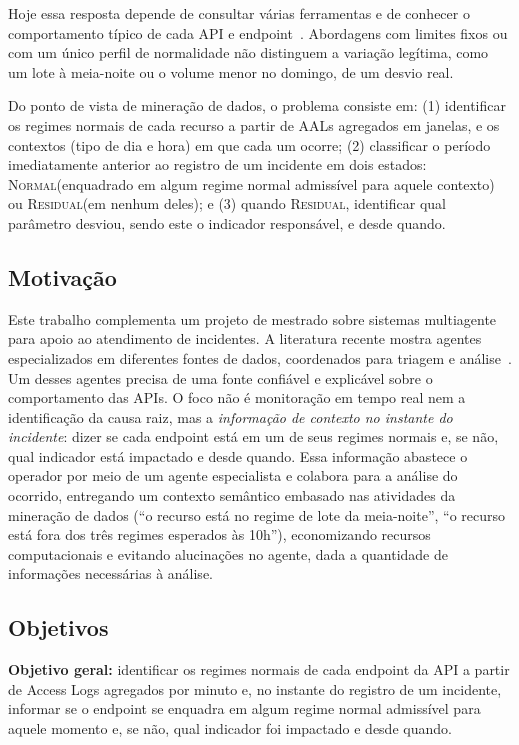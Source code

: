 \documentclass[sigconf,nonacm]{acmart}
\newcommand{\Normal}{\textsc{Normal}\xspace}
\newcommand{\Residual}{\textsc{Residual}\xspace}
\begin{document}
Hoje essa resposta depende de consultar várias ferramentas e de conhecer o comportamento típico de cada API e endpoint~\citep{zhang2025isre}. Abordagens com limites fixos ou com um único perfil de normalidade não distinguem a variação legítima, como um lote à meia-noite ou o volume menor no domingo, de um desvio real.

Do ponto de vista de mineração de dados, o problema consiste em: (1) identificar os regimes normais de cada recurso a partir de AALs agregados em janelas, e os contextos (tipo de dia e hora) em que cada um ocorre; (2) classificar o período imediatamente anterior ao registro de um incidente em dois estados: \Normal (enquadrado em algum regime normal admissível para aquele contexto) ou \Residual (em nenhum deles); e (3) quando \Residual, identificar qual parâmetro desviou, sendo este o indicador responsável, e desde quando.

\subsection{Motivação}
Este trabalho complementa um projeto de mestrado sobre sistemas multiagente para apoio ao atendimento de incidentes. A literatura recente mostra agentes especializados em diferentes fontes de dados, coordenados para triagem e análise~\citep{yu2025triangle,luo2025opsagent,zhang2025isre}. Um desses agentes precisa de uma fonte confiável e explicável sobre o comportamento das APIs. O foco não é monitoração em tempo real nem a identificação da causa raiz, mas a \emph{informação de contexto no instante do incidente}: dizer se cada endpoint está em um de seus regimes normais e, se não, qual indicador está impactado e desde quando. Essa informação abastece o operador por meio de um agente especialista e colabora para a análise do ocorrido, entregando um contexto semântico embasado nas atividades da mineração de dados (``o recurso está no regime de lote da meia-noite'', ``o recurso está fora dos três regimes esperados às 10h''), economizando recursos computacionais e evitando alucinações no agente, dada a quantidade de informações necessárias à análise.

\subsection{Objetivos}
\textbf{Objetivo geral:} identificar os regimes normais de cada endpoint da API a partir de Access Logs agregados por minuto e, no instante do registro de um incidente, informar se o endpoint se enquadra em algum regime normal admissível para aquele momento e, se não, qual indicador foi impactado e desde quando.
\end{document}
